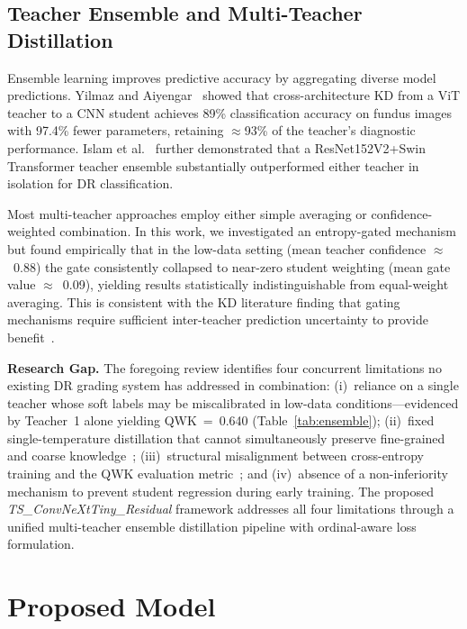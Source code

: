\documentclass[10pt, twocolumn]{article}
\begin{document}
\subsection{Teacher Ensemble and Multi-Teacher Distillation}

Ensemble learning improves predictive accuracy by aggregating diverse model
predictions. Yilmaz and Aiyengar~\cite{yilmaz2025} showed that cross-architecture
KD from a ViT teacher to a CNN student achieves 89\% classification accuracy on
fundus images with 97.4\% fewer parameters, retaining $\approx$93\% of the
teacher's diagnostic performance. Islam et al.~\cite{islam2023} further demonstrated
that a ResNet152V2+Swin Transformer teacher ensemble substantially outperformed
either teacher in isolation for DR classification.

Most multi-teacher approaches employ either simple averaging or confidence-weighted
combination. In this work, we investigated an entropy-gated mechanism but found
empirically that in the low-data setting (mean teacher confidence $\approx$~0.88)
the gate consistently collapsed to near-zero student weighting (mean gate value
$\approx$~0.09), yielding results statistically indistinguishable from equal-weight
averaging. This is consistent with the KD literature finding that gating mechanisms
require sufficient inter-teacher prediction uncertainty to provide
benefit~\cite{gou2021}.

\textbf{Research Gap.} The foregoing review identifies four concurrent limitations
no existing DR grading system has addressed in combination: (i)~reliance on a
single teacher whose soft labels may be miscalibrated in low-data
conditions---evidenced by Teacher~1 alone yielding QWK~=~0.640 (Table~\ref{tab:ensemble}); (ii)~fixed single-temperature distillation that cannot
simultaneously preserve fine-grained and coarse knowledge~\cite{hinton2015,gou2021}; (iii)~structural misalignment between cross-entropy
training and the QWK evaluation metric~\cite{bappi2025}; and (iv)~absence of a
non-inferiority mechanism to prevent student regression during early training. The
proposed \textit{TS\_ConvNeXtTiny\_Residual} framework addresses all four
limitations through a unified multi-teacher ensemble distillation pipeline with
ordinal-aware loss formulation.

\section{Proposed Model}
\end{document}
